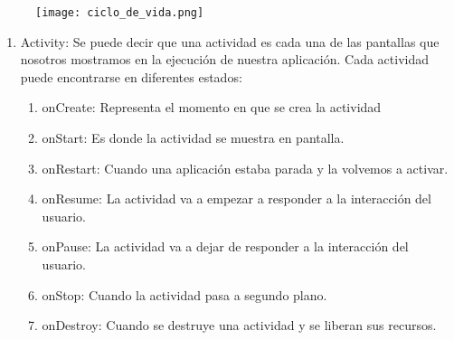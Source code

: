 \begin{figure}[h]
\texttt{[image: ciclo\_de\_vida.png]} 
\end{figure}
\begin{enumerate}

\item	Activity: Se puede decir que una actividad es cada una de
 las pantallas que nosotros mostramos en la ejecución de nuestra 
aplicación. Cada actividad puede encontrarse en diferentes estados:
\begin{enumerate}
\item	onCreate: Representa el momento en que se crea la actividad
\item	onStart: Es donde la actividad se muestra en pantalla.
\item	onRestart: Cuando una aplicación estaba parada y la volvemos a activar.
\item	onResume: La actividad va a empezar a responder a la interacción del usuario.
\item	onPause: La actividad va a dejar de responder a la interacción del usuario.
\item	onStop: Cuando la actividad pasa a segundo plano.
\item	onDestroy: Cuando se destruye una actividad y se liberan sus recursos.
\end{enumerate}





\end{enumerate}
